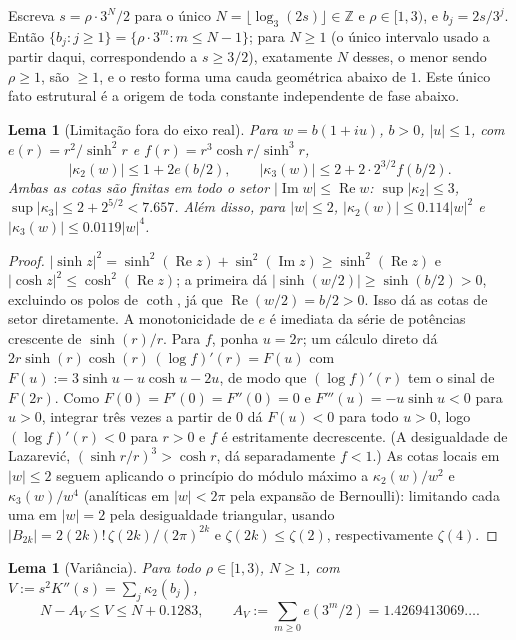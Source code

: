 \documentclass[11pt]{amsart}
\theoremstyle{plain}
\newtheorem{lemma}[theorem]{Lema}
\theoremstyle{definition}
\theoremstyle{remark}
\newcommand{\Z}{\mathbb{Z}}
\begin{document}
Escreva $s = \rho\cdot 3^N/2$ para o único $N = \lfloor \log_3(2s)\rfloor \in \Z$ e $\rho \in
[1,3)$, e $b_j = 2s/3^j$. Então $\{b_j : j \ge 1\} = \{\rho\cdot 3^m : m \le N-1\}$; para $N \ge 1$
(o único intervalo usado a partir daqui, correspondendo a $s \ge 3/2$), exatamente $N$ desses, o
menor sendo $\rho \ge 1$, são $\ge 1$, e o resto forma uma cauda geométrica abaixo de $1$. Este único
fato estrutural é a origem de toda constante independente de fase abaixo.

\begin{lemma}[Limitação fora do eixo real]
\label{lem:kappa}
Para $w = b(1+iu)$, $b>0$, $|u|\le 1$, com $e(r) = r^2/\sinh^2 r$ e $f(r) = r^3\cosh r/\sinh^3 r$,
\[
|\kappa_2(w)| \le 1 + 2e(b/2), \qquad |\kappa_3(w)| \le 2 + 2\cdot 2^{3/2} f(b/2).
\]
Ambas as cotas são finitas em todo o setor $|\operatorname{Im}w|\le\operatorname{Re}w$:
$\sup|\kappa_2|\le3$, $\sup|\kappa_3|\le2+2^{5/2}<7.657$. Além disso, para $|w|\le2$,
$|\kappa_2(w)| \le 0.114|w|^2$ e $|\kappa_3(w)|\le 0.0119|w|^4$.
\end{lemma}

\begin{proof}
$|\sinh z|^2 = \sinh^2(\operatorname{Re}z)+\sin^2(\operatorname{Im}z) \ge \sinh^2(\operatorname{Re}z)$
e $|\cosh z|^2 \le \cosh^2(\operatorname{Re}z)$; a primeira dá $|\sinh(w/2)|\ge\sinh(b/2)>0$,
excluindo os polos de $\coth$, já que $\operatorname{Re}(w/2)=b/2>0$. Isso dá as cotas de setor
diretamente. A monotonicidade de $e$ é imediata da série de potências crescente de $\sinh(r)/r$.
Para $f$, ponha $u=2r$; um cálculo direto dá $2r\sinh(r)\cosh(r)\,(\log f)'(r) = F(u)$ com
$F(u):=3\sinh u - u\cosh u - 2u$, de modo que $(\log f)'(r)$ tem o sinal de $F(2r)$. Como
$F(0)=F'(0)=F''(0)=0$ e $F'''(u)=-u\sinh u<0$ para $u>0$, integrar três vezes a partir de $0$ dá
$F(u)<0$ para todo $u>0$, logo $(\log f)'(r)<0$ para $r>0$ e $f$ é estritamente decrescente.
(A desigualdade de Lazarevi\'c, $(\sinh r/r)^3 > \cosh r$, dá separadamente $f<1$.) As cotas locais
em $|w|\le2$ seguem aplicando o princípio do módulo máximo a $\kappa_2(w)/w^2$ e $\kappa_3(w)/w^4$
(analíticas em $|w|<2\pi$ pela expansão de Bernoulli): limitando cada uma em $|w|=2$ pela
desigualdade triangular, usando $|B_{2k}| = 2(2k)!\,\zeta(2k)/(2\pi)^{2k}$ e $\zeta(2k)\le\zeta(2)$,
respectivamente $\zeta(4)$.
\end{proof}

\begin{lemma}[Variância]
\label{lem:variance}
Para todo $\rho\in[1,3)$, $N\ge1$, com $V := s^2K''(s) = \sum_j\kappa_2(b_j)$,
\[
N - A_V \le V \le N + 0.1283, \qquad A_V := \sum_{m\ge0} e(3^m/2) = 1.4269413069\ldots.
\]
\end{lemma}
\end{document}
